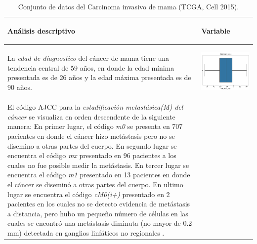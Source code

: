\begin{table}[!htb]
	\footnotesize
	\begin{threeparttable}
		\caption{Conjunto de datos del Carcinoma invasivo de mama (TCGA, Cell 2015).}
		\label{Analisis_Descriptivo}
		\begin{tabular}{p{8cm} p{7cm}} \toprule	 
			\begin{center}Análisis descriptivo\end{center}             
			&\begin{center}Variable\end{center}\\ \hline
			La \textit{edad de diagnostico} del cáncer de mama tiene una tendencia central de 59 años, en donde la edad mínima presentada es de  26 años y la edad máxima presentada es de 90 años.
			
			& \begin{center}\includegraphics[width=1\linewidth]{NOTEBOOK/IMAGENES_DESCRIPTIVAS/1_diagnosis_age}\end{center}
			\\ \hline
			El código AJCC para la \textit{estadificación metastásica(M) del cáncer} se visualiza en orden descendente de la siguiente manera: En primer lugar, el código \textit{m0} se presenta en 707 pacientes en donde el cáncer hizo metástasis pero no se  disemino a otras partes del cuerpo. En segundo lugar se encuentra el código \textit{mx} presentado en 96 pacientes a los cuales no fue posible medir la metástasis. En tercer lugar se encuentra el código \textit{m1} presentado en 13 pacientes en donde el cáncer se diseminó a otras partes del cuerpo. En ultimo lugar se encuentra el código \textit{cM0(i+)} presentado en 2 pacientes en los cuales no se detecto evidencia de metástasis a distancia, pero hubo un pequeño número de células en las cuales se encontró una metástasis diminuta (no mayor de 0.2 mm) detectada en ganglios linfáticos no regionales \cite{NCI}.
			

\end{tabular}
\end{threeparttable}
\end{table}

